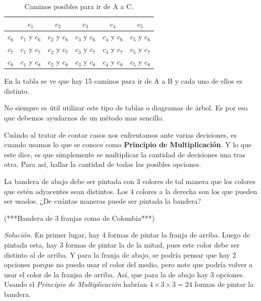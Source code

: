 \begin{center}
	\begin{table}[H]
		\centering
		\begin{tabular}{|c|c|c|c|c|c|}
			\hline
			& $c_1$        & $c_2$        & $c_3$        & $c_4$        & $c_5$        \\ \hline
			$c_6$ & $c_1$ y $c_6$ & $c_2$ y $c_6$ & $c_3$ y $c_6$ & $c_4$ y $c_6$ & $c_5$ y $c_6$ \\ \hline
			$c_7$ & $c_1$ y $c_7$ & $c_2$ y $c_7$ & $c_3$ y $c_7$ & $c_4$ y $c_7$ & $c_5$ y $c_7$ \\ \hline
			$c_8$ & $c_1$ y $c_8$ & $c_2$ y $c_8$ & $c_3$ y $c_8$ & $c_4$ y $c_8$ & $c_5$ y $c_8$ \\ \hline
		\end{tabular}
		\caption{Caminos posibles para ir de A a C.}
		\label{tablacaminosAaC}
	\end{table}
\end{center}


En la tabla se ve que hay 15 caminos para ir de A a B y cada uno de ellos es distinto.
\vspace{0.3cm}

No siempre es útil utilizar este tipo de tablas o diagramas de árbol. Es por eso que debemos ayudarnos de un método mas sencillo.

\begin{defi}
	Cuándo al tratar de contar casos nos enfrentamos ante varias decisiones, es cuando usamos lo que se conoce como \textbf{Principio de Multiplicación}. Y lo que este dice, es que simplemente se multiplicar la cantidad de decisiones una tras otra. Para así, hallar la cantidad de todas las posibles opciones.
\end{defi}

\begin{ejemplo}
	La bandera de abajo debe ser pintada con 3 colores de tal manera que los colores que estén adyacentes sean distintos. Los 4 colores a la derecha son los que pueden ser usados. ¿De cuántas maneras puede ser pintada la bandera? 
\end{ejemplo}
\vspace{2cm}

(***Bandera de 3 franjas como de Colombia***)

\vspace{2cm}

\textit{Solución.} En primer lugar, hay 4 formas de pintar la franja de arriba. Luego de pintada esta, hay 3 formas de pintar la de la mitad, pues este color debe ser distinto al de arriba. Y para la franja de abajo, se podría pensar que hay 2 opciones porque no puedo usar el color del medio, pero note que podría volver a usar el color de la franjsa de arriba. Así, que para la de abajo hay 3 opciones. Usando el \textit{Principio de Multiplicación} habrían $4\times 3\times 3=24$ formas de pintar la bandera.

